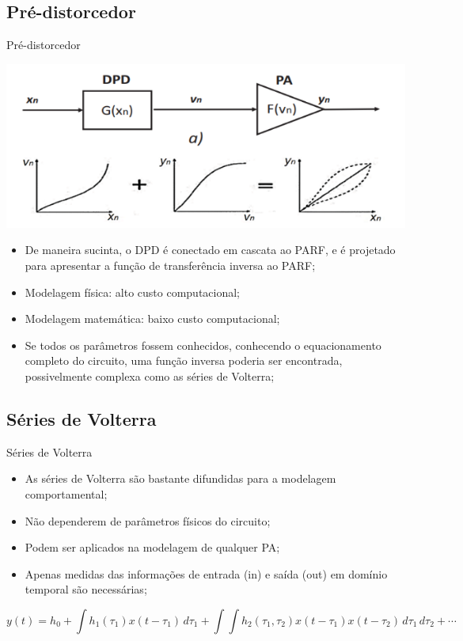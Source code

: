 \documentclass{if-beamer}
\begin{document}
\subsection{Pré-distorcedor}
\begin{frame}{Pré-distorcedor}
\begin{minipage}{0.5\textwidth}
		
		\includegraphics[scale=0.5]{DPDCascata.png}
		
	\end{minipage}%
	\hspace{0.04\textwidth}
	\begin{minipage}{0.5\textwidth}
		\begin{itemize}
			\item De maneira sucinta, o DPD é conectado em 
			cascata ao PARF, e é projetado para apresentar a 
			função de transferência inversa ao PARF;
			\item Modelagem física: alto custo computacional;
			\item Modelagem matemática: baixo custo computacional;
			\item Se todos os parâmetros fossem conhecidos, conhecendo o equacionamento completo do circuito, uma função inversa poderia ser encontrada, possivelmente complexa como as séries de Volterra;
		\end{itemize}
	\end{minipage}
\end{frame}
\subsection{Séries de Volterra}
\begin{frame}{Séries de Volterra}
		\begin{itemize}
			\item As séries de Volterra são bastante difundidas para a modelagem comportamental;
			\item Não dependerem de parâmetros físicos do circuito; 
			\item Podem ser aplicados na modelagem de qualquer PA;
			\item Apenas medidas das informações de entrada (in) e saída (out) em domínio temporal são necessárias;
		\end{itemize}
		\vspace{0.05\textwidth}
			\[
		y(t) = h_0 + \int h_1(\tau_1) x(t - \tau_1) \, d\tau_1 + \int \int h_2(\tau_1, \tau_2) x(t - \tau_1) x(t - \tau_2) \, d\tau_1 \, d\tau_2 + \cdots
		\]
\end{frame}
\end{document}
